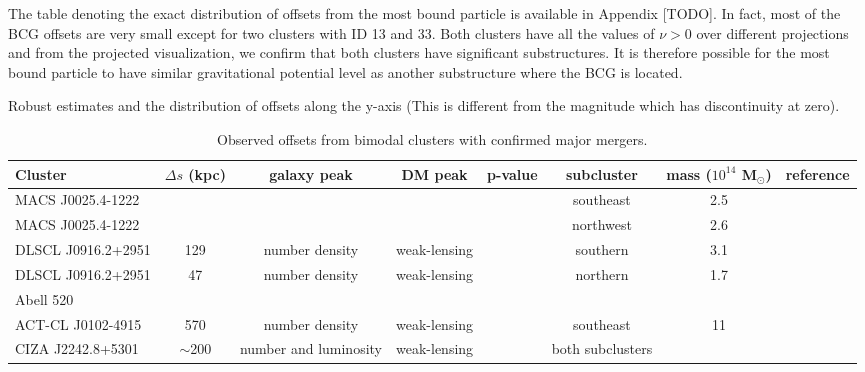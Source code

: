 The table denoting the exact distribution of offsets from the most bound 
particle is available in Appendix [TODO]. 
In fact, most of the BCG offsets are very small except for two clusters with ID 13
and 33. Both clusters have all the values  of $\nu > 0 $ over different projections  
and from the projected visualization, we confirm that
both clusters have significant substructures. It is therefore possible for the
most bound particle to have similar gravitational potential level as another 
substructure where the BCG is located. 

\begin{table*}
	\begin{minipage}{170mm}
	\begin{center}
		\caption{Robust estimates and the distribution of offsets along the y-axis
			(This is different from the magnitude which has discontinuity at zero).
		\label{tab:p_val_table}
	}
	
	\end{center}
	\end{minipage}
\end{table*}

\begin{table*}
	 \begin{center}
	 \caption{Observed offsets from bimodal clusters with confirmed major mergers.\label{tab:offset_results}} 
	 \begin{tabular}{@{}lccccccc@{}}
	 \hline 
	 Cluster & $\Delta s$ (kpc) & galaxy peak & DM peak &  p-value & subcluster &
	 mass ($10^{14}$ M$_\odot$) &  reference\\
	 \hline
	 MACS J0025.4-1222 & & & & & southeast &2.5& \citealt{Bradac2008}\\
	 MACS J0025.4-1222 & & & & & northwest &2.6& \citealt{Bradac2008} \\
	 DLSCL J0916.2+2951 & 129 & number density & weak-lensing &  & southern & 3.1 &  \\
	 DLSCL J0916.2+2951 & 47 & number density & weak-lensing &  &northern & 1.7 & \\
	 Abell 520 & & & & & & & \\
	 ACT-CL J0102-4915 & 570 & number density & weak-lensing & & southeast & 11 & \citealt{Jee2014} \\
	 CIZA J2242.8+5301 & $\sim$200 & number and luminosity & weak-lensing & & both
	 subclusters & & \citealt{Jee2015}\\ 
	 \hline
	 \end{tabular} 
	 \end{center} 
\end{table*}


